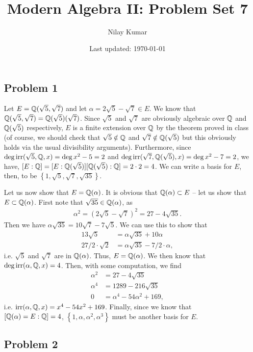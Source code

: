 \documentclass{../../mathnotes}
\title{Modern Algebra II: Problem Set 7}
\author{Nilay Kumar}
\date{Last updated: \today}
\begin{document}
\maketitle

\subsection*{Problem 1}

Let $E=\mathbb{Q}(\sqrt{5},\sqrt{7})$ and let $\alpha=2\sqrt{5}-\sqrt{7}\in E$. We know that $\mathbb{Q}(\sqrt{5},\sqrt{7})=\mathbb{Q}(\sqrt{5})(\sqrt{7})$.
Since $\sqrt{5}$ and $\sqrt{7}$ are obviously algebraic over $\mathbb{Q}$ and $\mathbb{Q}(\sqrt{5})$ respectively, $E$ is a finite extension over
$\mathbb{Q}$ by the theorem proved in class (of course, we should check that $\sqrt{5}\notin\mathbb{Q}$ and $\sqrt{7}\notin\mathbb{Q}(\sqrt{5})$ but this obviously holds
via the usual divisibility arguments). Furthermore, since $\deg\operatorname{irr}(\sqrt{5},\mathbb{Q},x)=\deg x^2-5=2$ and $\deg\operatorname{irr}(\sqrt{7},\mathbb{Q}(\sqrt{5}),x)=\deg x^2-7=2$,
we have, $[E:\mathbb{Q}]=[E:\mathbb{Q}(\sqrt{5})][\mathbb{Q}(\sqrt{5}):\mathbb{Q}]=2\cdot2=4$. We can write a basis for $E$, then, to be $\left\{1,\sqrt{5},\sqrt{7},\sqrt{35}\right\}$.

Let us now show that $E=\mathbb{Q}(\alpha)$. It is obvious that $\mathbb{Q}(\alpha)\subset E$ -- let us show that $E\subset \mathbb{Q}(\alpha)$. First note that
$\sqrt{35}\in\mathbb{Q}(\alpha)$, as
\begin{align*}
    \alpha^2=(2\sqrt{5}-\sqrt{7})^2=27-4\sqrt{35}.
\end{align*}
Then we have $\alpha\sqrt{35}=10\sqrt{7}-7\sqrt{5}$. We can use this to show that
\begin{align*}
    13\sqrt{5}&=\alpha\sqrt{35}+10\alpha\\
    27/2\cdot\sqrt{2}&=\alpha\sqrt{35}-7/2\cdot\alpha,
\end{align*}
i.e. $\sqrt{5}$ and $\sqrt{7}$ are in $\mathbb{Q}(\alpha)$. Thus, $E=\mathbb{Q}(\alpha)$. We then know that $\deg\operatorname{irr}(\alpha,\mathbb{Q},x)=4$. Then, with some computation,
we find
\begin{align*}
    \alpha^2&=27-4\sqrt{35}\\
    \alpha^4&=1289-216\sqrt{35}\\
    0&=\alpha^4-54\alpha^2+169,
\end{align*}
i.e. $\operatorname{irr}(\alpha,\mathbb{Q},x)=x^4-54x^2+169$. Finally, since we know that $[\mathbb{Q}(\alpha)=E:\mathbb{Q}]=4$, $\left\{ 1,\alpha,\alpha^2,\alpha^3 \right\}$ must
be another basis for $E$.

\subsection*{Problem 2}
\end{document}
